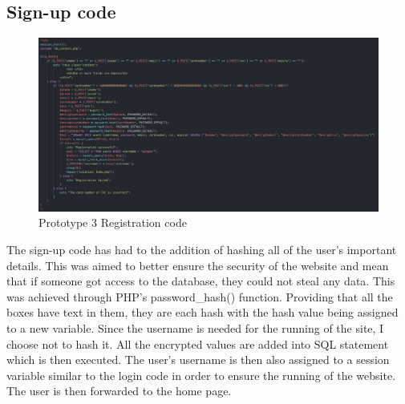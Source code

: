 \subsection{Sign-up code}
\begin{figure}[H]
    \centering
    \includegraphics[scale=0.35]{ch3_developing/proto3/register.png}
    \caption{Prototype 3 Registration code}
    \label{fig:proto3_register}
\end{figure}
The sign-up code has had to the addition of hashing all of the user’s important details. This was aimed to better ensure the security of the website and mean that if someone got access to the database, they could not steal any data. This was achieved through PHP’s password\_hash() function. Providing that all the boxes have text in them, they are each hash with the hash value being assigned to a new variable. Since the username is needed for the running of the site, I choose not to hash it. All the encrypted values are added into SQL statement which is then executed. The user’s username is then also assigned to a session variable similar to the login code in order to ensure the running of the website. The user is then forwarded to the home page.
